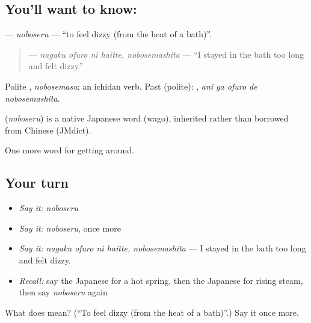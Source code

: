 \subsection*{You'll want to know: }
\textbf{} — \emph{noboseru} — \textquotedblleft{}to feel dizzy (from the heat of a bath)\textquotedblright{}.

\begin{quote}
\textbf{  } — \emph{nagaku ofuro ni haitte, nobosemashita} — \textquotedblleft{}I stayed in the bath too long and felt dizzy.\textquotedblright{}
\end{quote}

Polite \textbf{}, \emph{nobosemasu}; an ichidan verb. Past (polite): \textbf{  }, \emph{ani ga ofuro de nobosemashita}.

\begin{cousinweb}
\textbf{} (\emph{noboseru}) is a native Japanese word (wago), inherited rather than borrowed from Chinese (JMdict).
\end{cousinweb}

\begin{grammarlens}[title={What you've built}]
One more word for getting around.
\end{grammarlens}

\subsection*{Your turn}
\begin{itemize}
\raggedright
  \item \emph{Say it:} \emph{noboseru}
  \item \emph{Say it:} \emph{noboseru}, once more
  \item \emph{Say it:} \emph{nagaku ofuro ni haitte, nobosemashita} — I stayed in the bath too long and felt dizzy.
  \item \emph{Recall:} say the Japanese for a hot spring, then the Japanese for rising steam, then say \emph{noboseru} again
\end{itemize}

\begin{tcolorbox}[breakable,colback=teal!4,colframe=teal!35!black,title={Before you move on}]
What does  mean? (\textquotedblleft{}To feel dizzy (from the heat of a bath)\textquotedblright{}.) Say it once more.
\end{tcolorbox}
